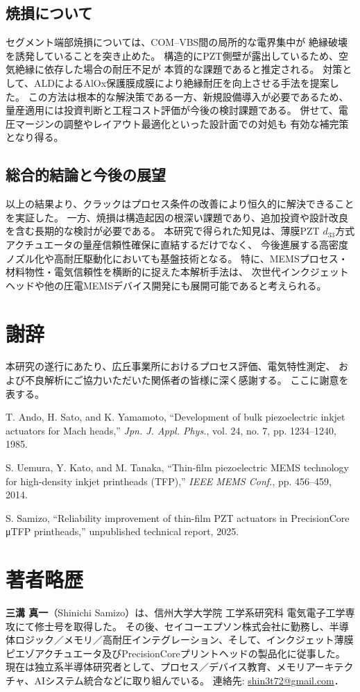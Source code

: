 \documentclass[conference]{IEEEtran}
\begin{document}
\subsection{焼損について}
セグメント端部焼損については、COM--VBS間の局所的な電界集中が
絶縁破壊を誘発していることを突き止めた。
構造的にPZT側壁が露出しているため、空気絶縁に依存した場合の耐圧不足が
本質的な課題であると推定される。
対策として、ALDによるAlOx保護膜成膜により絶縁耐圧を向上させる手法を提案した。
この方法は根本的な解決策である一方、新規設備導入が必要であるため、
量産適用には投資判断と工程コスト評価が今後の検討課題である。
併せて、電圧マージンの調整やレイアウト最適化といった設計面での対処も
有効な補完策となり得る。

\subsection{総合的結論と今後の展望}
以上の結果より、クラックはプロセス条件の改善により恒久的に解決できることを実証した。
一方、焼損は構造起因の根深い課題であり、追加投資や設計改良を含む長期的な検討が必要である。
本研究で得られた知見は、薄膜PZT $d_{33}$方式アクチュエータの量産信頼性確保に直結するだけでなく、
今後進展する高密度ノズル化や高耐圧駆動化においても基盤技術となる。
特に、MEMSプロセス・材料物性・電気信頼性を横断的に捉えた本解析手法は、
次世代インクジェットヘッドや他の圧電MEMSデバイス開発にも展開可能であると考えられる。

\section*{謝辞}
本研究の遂行にあたり、広丘事業所におけるプロセス評価、電気特性測定、  
および不良解析にご協力いただいた関係者の皆様に深く感謝する。  
ここに謝意を表する。

\begin{thebibliography}{99}

T. Ando, H. Sato, and K. Yamamoto, 
``Development of bulk piezoelectric inkjet actuators for Mach heads,'' 
\textit{Jpn. J. Appl. Phys.}, vol. 24, no. 7, pp. 1234--1240, 1985.

S. Uemura, Y. Kato, and M. Tanaka, 
``Thin-film piezoelectric MEMS technology for high-density inkjet printheads (TFP),'' 
\textit{IEEE MEMS Conf.}, pp. 456--459, 2014.

S. Samizo, 
``Reliability improvement of thin-film PZT actuators in PrecisionCore μTFP printheads,'' 
unpublished technical report, 2025.

\end{thebibliography}

\section*{著者略歴}
\textbf{三溝 真一}（Shinichi Samizo）は、信州大学大学院 工学系研究科 電気電子工学専攻にて修士号を取得した。  
その後、セイコーエプソン株式会社に勤務し、半導体ロジック／メモリ／高耐圧インテグレーション、そして、インクジェット薄膜ピエゾアクチュエータ及びPrecisionCoreプリントヘッドの製品化に従事した。  
現在は独立系半導体研究者として、プロセス／デバイス教育、メモリアーキテクチャ、AIシステム統合などに取り組んでいる。  
連絡先: \href{mailto:shin3t72@gmail.com}{shin3t72@gmail.com}．
\end{document}
